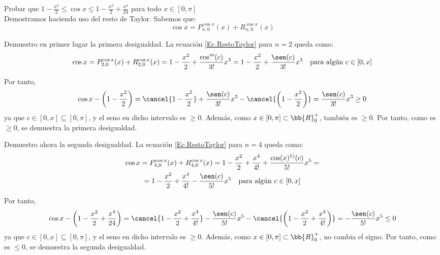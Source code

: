 \begin{ejercicio}
    Probar que $\displaystyle 1 - \frac{x^2}{2} \leq \cos x \leq 1 - \frac{x^2}{2} + \frac{x^4}{24}$ para todo $x \in [0, \pi]$\\

    Demostramos haciendo uso del resto de Taylor. Sabemos que:
    \begin{equation}\label{Ec.RestoTaylor}
        \cos x = P_{n, 0}^{\cos x} (x) + R_{n, 0}^{\cos x} (x)
    \end{equation}
    
    Demuestro en primer lugar la primera desigualdad. La ecuación \ref{Ec.RestoTaylor} para $n=2$ queda como:
    \begin{equation*}
        \cos x = P_{2, 0}^{\cos x} (x) + R_{2, 0}^{\cos x} (x) = 1 - \frac{x^2}{2} + \frac{\cos'''(c)}{3!}x^3 = 1 - \frac{x^2}{2} + \frac{\sen(c)}{3!}x^3 \quad \text{para algún } c \in [0, x]
    \end{equation*}

    Por tanto,
    \begin{equation*}
        \cos x - \left( 1-\frac{x^2}{2}\right) = \cancel{1 - \frac{x^2}{2}} + \frac{\sen(c)}{3!}x^3 - \cancel{\left( 1-\frac{x^2}{2}\right)} = \frac{\sen(c)}{3!}x^3 \geq 0
    \end{equation*}
    ya que $c\in  [0,x] \subseteq [0,\pi]$, y el seno en dicho intervalo es $\geq 0$. Además, como $x\in [0, \pi] \subset \bb{R}^+_0$, también es $\geq 0$. Por tanto, como es $\geq 0$, se demuestra la primera desigualdad.

    Demuestro ahora la segunda desigualdad. La ecuación \ref{Ec.RestoTaylor} para $n=4$ queda como:
    \begin{multline*}
        \cos x = P_{4, 0}^{\cos x} (x) + R_{4, 0}^{\cos x} (x) = 1 - \frac{x^2}{2} + \frac{x^4}{4!} + \frac{\cos(x)^{5)}(c)}{5!}x^5
        =\\=
        1 - \frac{x^2}{2} + \frac{x^4}{4!} - \frac{\sen(c)}{5!}x^5 \quad \text{para algún } c \in [0, x]
    \end{multline*}

    Por tanto,
    \begin{equation*}
        \cos x - \left( 1-\frac{x^2}{2} + \frac{x^4}{24}\right) = \cancel{1 - \frac{x^2}{2} + \frac{x^4}{4!}} - \frac{\sen(c)}{5!}x^5 - \cancel{\left( 1-\frac{x^2}{2} + \frac{x^4}{4!}\right)} = -\frac{\sen(c)}{5!}x^5 \leq 0
    \end{equation*}
    ya que $c\in  [0,x] \subseteq [0,\pi]$, y el seno en dicho intervalo es $\geq 0$. Además, como $x\in [0, \pi] \subset \bb{R}^+_0$, no cambia el signo. Por tanto, como es $\leq 0$, se demuestra la segunda desigualdad.
    
    
\end{ejercicio}

